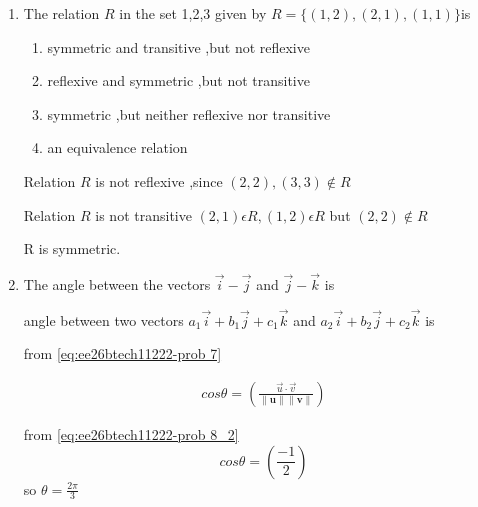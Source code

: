 \begin{enumerate}[label=\thesubsection.\arabic*, ref=\thesubsection.\theenumi]
foot of perpendicular of the point  $(x_1,y_1,z_1)$ on the y-axis is $$(0,y_1,0) \implies (0,-3,0)$$



\item 
The relation $R$ in the set {1,2,3} given by $R=\{(1,2),(2,1),(1,1)\} $is

\begin{enumerate}
	\item symmetric and transitive ,but not reflexive 
	\item reflexive and symmetric ,but not transitive 
	\item symmetric ,but neither reflexive nor transitive 
	\item an equivalence relation 
\end{enumerate}

\solution
 Relation $R$ is not reflexive ,since $(2,2),(3,3) \notin R$
 
 Relation $R$ is not transitive $(2,1) \epsilon R ,(1,2) \epsilon R  $ but $(2,2) \notin R$
 
R is symmetric.
 
 
   
\item 

The angle between the vectors $\vec{i}-\vec{j}$ and $\vec{j}-\vec{k}$ is
\begin{enumerate}
\end{enumerate}

\solution 

angle between two vectors $a_1\vec{i} + b_1\vec{j} +c_1\vec{k} $ and $a_2\vec{i} +b_2\vec{j} +c_2\vec{k}$ is 

from \eqref{eq:ee26btech11222-prob 7}

\begin{align}
	cos\theta = \left( \frac{\vec{u}\cdot \vec{v}}{\|\mathbf{u}\|\|\mathbf{v}\|}\right)
\end{align}

from \eqref{eq:ee26btech11222-prob 8_2}
$$cos\theta = \left( \frac{-1}{2}\right)$$ so $\theta =\frac{2\pi}{3}$


\end{enumerate}
